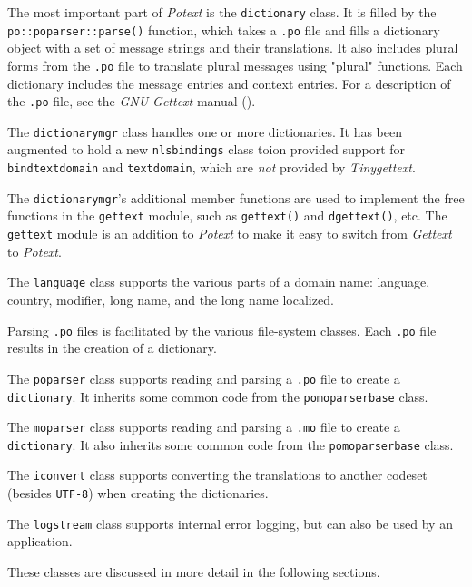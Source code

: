    The most important part of \textsl{Potext} is the
   \texttt{dictionary} class.
   It is filled by the \texttt{po::poparser::parse()} function,
   which takes a \texttt{.po} file and fills a dictionary object
   with a set of message strings and their translations.
   It also includes plural forms from the \texttt{.po} file to
   translate plural messages using "plural" functions.
   Each dictionary includes the message entries and context entries.
   For a description of the \texttt{.po} file, see
   the \textsl{GNU Gettext} manual (\cite{gettextman}).

   The \texttt{dictionarymgr} class handles one or more dictionaries.
   It has been augmented to hold a new \texttt{nlsbindings} class toion
   provided support for \texttt{bindtextdomain} and \texttt{textdomain},
   which are \textsl{not} provided by \textsl{Tinygettext}.

   The \texttt{dictionarymgr}'s additional member functions are used
   to implement the free functions in the \texttt{gettext} module, such
   as \texttt{gettext()} and \texttt{dgettext()},
   etc.
   The \texttt{gettext} module is an addition to \textsl{Potext} to
   make it easy to switch from \textsl{Gettext} to \textsl{Potext}.

   The \texttt{language} class supports the various parts of
   a domain name: language, country, modifier, long name, and the
   long name localized.

   Parsing \texttt{.po} files is facilitated by the various file-system
   classes. Each \texttt{.po} file results in the creation of a dictionary.

   The \texttt{poparser} class supports reading and parsing a
   \texttt{.po} file to create a \texttt{dictionary}.
   It inherits some common code from the
   \texttt{pomoparserbase} class.

   The \texttt{moparser} class supports reading and parsing a
   \texttt{.mo} file to create a \texttt{dictionary}.
   It also inherits some common code from the
   \texttt{pomoparserbase} class.

   The \texttt{iconvert} class supports converting the translations
   to another codeset (besides \texttt{UTF-8}) when creating the
   dictionaries.

   The \texttt{logstream} class supports internal error logging,
   but can also be used by an application.

   These classes are discussed in more detail in the following sections.

